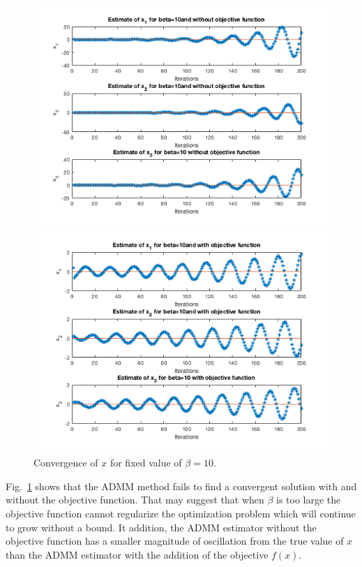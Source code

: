 \documentclass[answers]{exam}
\begin{document}
\begin{itemize}
\begin{framed}
\begin{figure}[H]
    \centering
    \caption{Convergence of $x$ for fixed value of $\beta=10$.}
    \begin{minipage}{.5\textwidth}
        \centering
        \includegraphics[width=1.1\textwidth, height=0.3\textheight]{Problem7_11.png}
    \end{minipage}%
    \begin{minipage}{0.5\textwidth}
        \centering
        \includegraphics[width=1.1\textwidth, height=0.3\textheight]{Problem7_22.png}
    \end{minipage}
    \label{ob10}
\end{figure}
Fig.~\ref{ob10} shows that the ADMM method fails to find a convergent solution with and without the objective function. That may suggest that when $\beta$ is too large the objective function cannot regularize the optimization problem which will continue to grow without a bound. It addition, the ADMM estimator without the objective function has a smaller magnitude of oscillation from the true value of $x$ than the ADMM estimator with the addition of the objective $f(x)$.



\end{framed}
\end{itemize}
\end{document}
